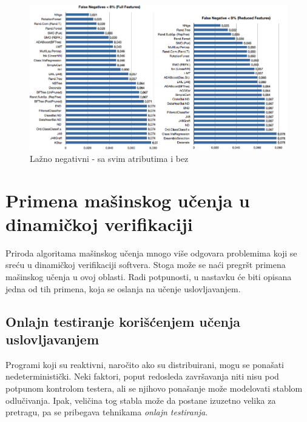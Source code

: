 \documentclass[a4paper]{article}
\theoremstyle{definition}
\begin{document}
{\begin{figure}[h!]
\centering
\includegraphics[width=\textwidth]{false_negative.png}
\caption{Lažno negativni - sa svim atributima i bez}
\label{fig:falseNeg}
\end{figure}

\section{Primena mašinskog učenja u dinamičkoj verifikaciji}
\label{sec:dinamcikaPrimena}

Priroda algoritama mašinskog učenja mnogo više odgovara problemima koji se sreću 
u dinamičkoj verifikaciji softvera. Stoga može se naći pregršt primena mašinskog 
učenja u ovoj oblasti. Radi potpunosti, u nastavku će biti opisana jedna od tih 
primena, koja se oslanja na učenje uslovljavanjem.


\subsection{Onlajn testiranje korišćenjem učenja uslovljavanjem }

Programi koji su reaktivni, naročito ako su distribuirani, mogu se ponašati nedeterministički. Neki faktori, poput redosleda završavanja niti nisu pod potpunom kontrolom testera, ali se njihovo ponašanje može modelovati stablom odlučivanja. Ipak, veličina tog stabla može da postane izuzetno velika za pretragu, pa se pribegava tehnikama \emph{onlajn testiranja}.

}
\end{document}
